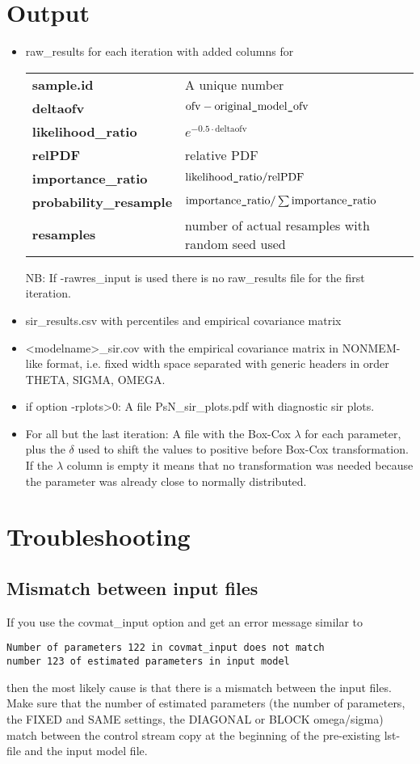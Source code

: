 \section{Output}
\begin{itemize}
\item raw\_results for each iteration with added columns for\\
\begin{tabular}{ll}
\bf{sample.id} & A unique number\\
\bf{deltaofv} & $\mathrm{ofv} - \mathrm{original}\mbox{\tt\string_}\mathrm{model}\mbox{\tt\string_}\mathrm{ofv}$\\
\bf{likelihood\_ratio} & $e^{-0.5\cdot \mathrm{deltaofv}}$ \\
\bf{relPDF} & relative PDF \\
\bf{importance\_ratio} & $\mathrm{likelihood}\mbox{\tt\string_}\mathrm{ratio}/\mathrm{relPDF}$\\
\bf{probability\_resample} & $\mathrm{importance}\mbox{\tt\string_}\mathrm{ratio}/\sum{\mathrm{importance}\mbox{\tt\string_}\mathrm{ratio}}$ \\
\bf{resamples} & number of actual resamples with random seed used\\
\end{tabular}
NB: If -rawres\_input is used there is no raw\_results file for the first iteration.
\item sir\_results.csv with percentiles and empirical covariance matrix
\item <modelname>\_sir.cov with the empirical covariance matrix in NONMEM-like format, i.e. 
      fixed width space separated with generic headers in order THETA, SIGMA, OMEGA.
\item if option -rplots>0: A file PsN\_sir\_plots.pdf with diagnostic sir plots.
\item For all but the last iteration: A file with the Box-Cox $\lambda$ for each parameter, plus the $\delta$ used to shift
the values to positive before Box-Cox transformation. If the $\lambda$ column is empty it means that no transformation was
needed because the parameter was already close to normally distributed.
\end{itemize}


\section{Troubleshooting}
\subsection*{Mismatch between input files}
If you use the covmat\_input option and get an error message similar to
\begin{verbatim}
Number of parameters 122 in covmat_input does not match 
number 123 of estimated parameters in input model
\end{verbatim}
then the most likely cause is that there is a mismatch between the input files. Make sure that the number of
estimated parameters (the number of parameters, the FIXED and SAME settings, the DIAGONAL or BLOCK omega/sigma)
match between the control stream copy at the beginning of the pre-existing lst-file and the input model file.
